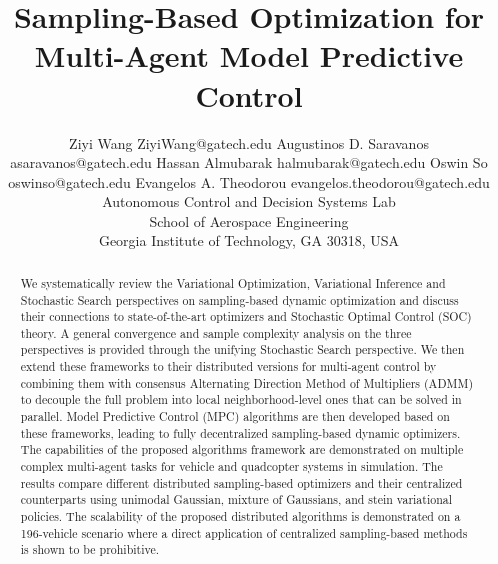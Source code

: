 \documentclass[twoside,11pt]{article}
\begin{document}
\title{Sampling-Based Optimization for Multi-Agent Model Predictive Control}

\author{\name Ziyi Wang \email ZiyiWang@gatech.edu
       \AND
       Augustinos D. Saravanos \email asaravanos@gatech.edu
       \AND
      Hassan Almubarak \email halmubarak@gatech.edu
      \AND
      Oswin So \email
      oswinso@gatech.edu
      \AND
      \name Evangelos A.  Theodorou \email evangelos.theodorou@gatech.edu \\
      \addr Autonomous Control and Decision Systems Lab \\
      \addr School of Aerospace Engineering\\
      Georgia Institute of Technology, GA 30318, USA}


\maketitle

\begin{abstract}%
We systematically review the Variational Optimization, Variational Inference and Stochastic Search perspectives on sampling-based dynamic optimization and discuss their connections to state-of-the-art optimizers and Stochastic Optimal Control (SOC) theory. A general convergence and sample complexity analysis on the three perspectives is provided through the unifying Stochastic Search perspective. We then extend these frameworks to their distributed versions for multi-agent control by combining them with consensus Alternating Direction Method of Multipliers (ADMM) to decouple the full problem into local neighborhood-level ones that can be solved in parallel. Model Predictive Control (MPC) algorithms are then developed based on these frameworks, leading to fully decentralized sampling-based dynamic optimizers. The capabilities of the proposed algorithms framework are demonstrated on multiple complex multi-agent tasks for vehicle and quadcopter systems in simulation. The results compare different distributed sampling-based optimizers and their centralized counterparts using unimodal Gaussian, mixture of Gaussians, and stein variational policies. The scalability of the proposed distributed algorithms is demonstrated on a 196-vehicle scenario where a direct application of centralized sampling-based methods is shown to be prohibitive.
\end{abstract}
\end{document}
